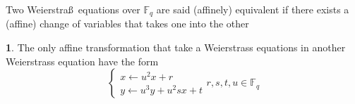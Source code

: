 \documentclass[handout]{beamer}%
\newcommand{\F}{\mathbb F}
\theoremstyle{definition}
\newtheorem{Note}[theorem]{\translate{Note}}
\begin{document}
\begin{frame}
% 
% 
% 
% 
% 
% 
\begin{Definition}
 Two Weierstra\ss\ equations over $\F_q$ are said (affinely) equivalent if there exists a (affine) change of variables that takes one
into the other
\end{Definition}
\pause


\begin{Note}{The only affine transformation that take a Weierstrass equations in another Weierstrass equation have the form}
$$\begin{cases}
x\longleftarrow u^2 x+r\\
y\longleftarrow u^3 y+ u^2s x + t
  \end{cases} r,s,t,u\in\F_q$$
\end{Note}
\end{frame}
\end{document}
